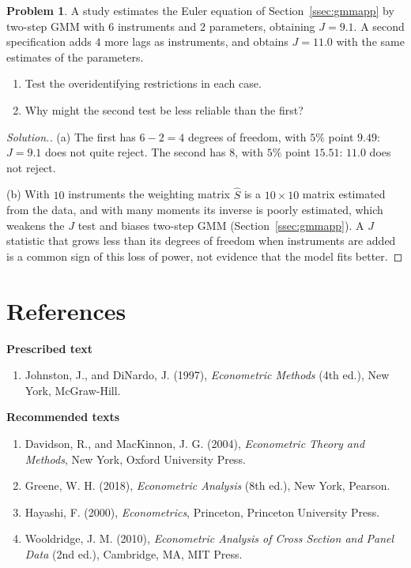 \documentclass[11pt,a4paper]{article}
\numberwithin{equation}{section}
\theoremstyle{definition}
\newtheorem{problemx}{Problem}[subsection]
\newenvironment{problem}{\begin{problemx}}{\end{problemx}}
\newenvironment{solution}
  {\renewcommand{\qedsymbol}{}\begin{proof}[\textit{Solution}.]}
  {\end{proof}}
\newcommand{\subhead}[1]{%
  \par\medskip\noindent\textbf{#1}\par\nobreak\smallskip}
\begin{document}
\begin{problem}
A study estimates the Euler equation of Section~\ref{ssec:gmmapp} by two-step GMM with $6$ instruments and $2$ parameters, obtaining $J = 9.1$. A second
specification adds $4$ more lags as instruments, and obtains $J = 11.0$ with the same estimates of the parameters.
\begin{enumerate}[label=(\alph*)]
\item Test the overidentifying restrictions in each case.
\item Why might the second test be less reliable than the first?
\end{enumerate}
\end{problem}

\begin{solution}
(a) The first has $6 - 2 = 4$ degrees of freedom, with $5\%$ point $9.49$: $J = 9.1$ does not quite reject. The second has $8$, with $5\%$ point $15.51$: $11.0$ does not reject.

(b) With $10$ instruments the weighting matrix $\hat S$ is a $10 \times 10$ matrix estimated from the data, and with many moments its inverse is poorly estimated, which
weakens the $J$ test and biases two-step GMM (Section~\ref{ssec:gmmapp}). A $J$ statistic that grows less than its degrees of freedom when instruments are added is a
common sign of this loss of power, not evidence that the model fits better.
\end{solution}

\section*{References}

\subhead{Prescribed text}
\begin{enumerate}
\item Johnston, J., and DiNardo, J. (1997), \emph{Econometric Methods} (4th ed.), New York, McGraw-Hill.
\end{enumerate}

\subhead{Recommended texts}
\begin{enumerate}
\item Davidson, R., and MacKinnon, J. G. (2004), \emph{Econometric Theory and Methods}, New York, Oxford University Press.
\item Greene, W. H. (2018), \emph{Econometric Analysis} (8th ed.), New York, Pearson.
\item Hayashi, F. (2000), \emph{Econometrics}, Princeton, Princeton University Press.
\item Wooldridge, J. M. (2010), \emph{Econometric Analysis of Cross Section and Panel Data} (2nd ed.), Cambridge, MA, MIT Press.
\end{enumerate}
\end{document}
